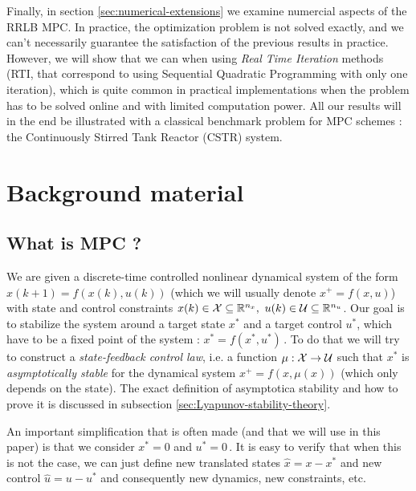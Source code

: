 \documentclass[12pt]{article}
\begin{document}
Finally, in section \ref{sec:numerical-extensions} we examine numercial aspects of the RRLB MPC.
In practice, the optimization problem is not solved exactly, and we can't necessarily guarantee the satisfaction of the previous results in practice. 
However, we will show that we can when using \textit{Real Time Iteration} methods (RTI, that correspond to using Sequential Quadratic Programming with only one iteration), which is quite common in practical implementations when the problem has to be solved online and with limited computation power.
All our results will in the end be illustrated with a classical benchmark problem for MPC schemes : the Continuously Stirred Tank Reactor (CSTR) system.

\section{Background material}\label{sec:background-material}

\subsection{What is MPC ?}\label{sec:what-is-MPC}

We are given a discrete-time controlled nonlinear dynamical system of the form $x(k+1)=f(x(k), u(k))$ (which we will usually denote $x^+=f(x,u)$) with state and control constraints $x(k)\in\cal{X}\subseteq\R^{n_x},~u(k)\in\cal{U}\subseteq\R^{n_u}$.
Our goal is to stabilize the system around a target state $x^*$ and a target control $u^*$, which have to be a fixed point of the system : $x^*=f(x^*, u^*)$\,.
To do that we will try to construct a \textit{state-feedback control law}, i.e. a function $\mu:\cal{X}\to\cal{U}$ such that $x^*$ is \textit{asymptotically stable} for the dynamical system $x^+=f(x,\mu(x))$ (which only depends on the state).
The exact definition of asymptotica stability and how to prove it is discussed in subsection \ref{sec:Lyapunov-stability-theory}.

An important simplification that is often made (and that we will use in this paper) is that we consider $x^*=0$ and $u^*=0$\,.
It is easy to verify that when this is not the case, we can just define new translated states $\hat{x}=x-x^*$ and new control $\hat{u}=u-u^*$ and consequently new dynamics, new constraints, etc.
\end{document}
